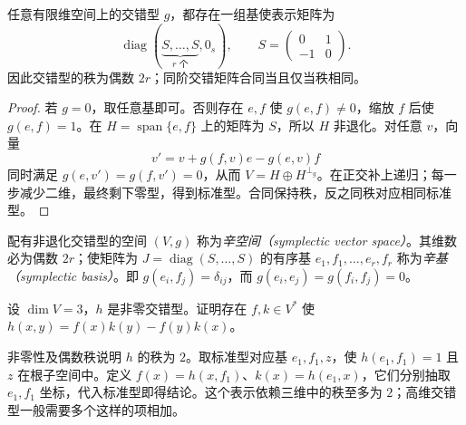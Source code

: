 \begin{theorem}
\label{thm:laex-alternating-normal}
任意有限维空间上的交错型 $g$，都存在一组基使表示矩阵为
\begin{equation}
 \operatorname{diag}(\underbrace{S,\ldots,S}_{r\text{ 个}},0_s),
 \qquad S=\begin{pmatrix}0&1\\-1&0\end{pmatrix}.
 \label{eq:laex-alternating-normal}
\end{equation}
因此交错型的秩为偶数 $2r$；同阶交错矩阵合同当且仅当秩相同。
\end{theorem}
\begin{proof}
若 $g=0$，取任意基即可。否则存在 $e,f$ 使 $g(e,f)\ne0$，缩放 $f$ 后使 $g(e,f)=1$。在 $H=\operatorname{span}\{e,f\}$ 上的矩阵为 $S$，所以 $H$ 非退化。对任意 $v$，向量
\begin{equation}
 v'=v+g(f,v)e-g(e,v)f
 \label{eq:laex-symplectic-elimination}
\end{equation}
同时满足 $g(e,v')=g(f,v')=0$，从而 $V=H\oplus H^{\perp_g}$。在正交补上递归；每一步减少二维，最终剩下零型，得到标准型。合同保持秩，反之同秩对应相同标准型。
\end{proof}

\begin{definition}
配有非退化交错型的空间 $(V,g)$ 称为\emph{辛空间（symplectic vector space）}。其维数必为偶数 $2r$；使矩阵为 $J=\operatorname{diag}(S,\ldots,S)$ 的有序基 $e_1,f_1,\ldots,e_r,f_r$ 称为\emph{辛基（symplectic basis）}。即 $g(e_i,f_j)=\delta_{ij}$，而 $g(e_i,e_j)=g(f_i,f_j)=0$。
\end{definition}

\begin{example}
\label{ex:laex-three-dimensional-alternating}
设 $\dim V=3$，$h$ 是非零交错型。证明存在 $f,k\in V^*$ 使 $h(x,y)=f(x)k(y)-f(y)k(x)$。
\end{example}
\begin{solve}
非零性及偶数秩说明 $h$ 的秩为 $2$。取标准型对应基 $e_1,f_1,z$，使 $h(e_1,f_1)=1$ 且 $z$ 在根子空间中。定义 $f(x)=h(x,f_1)$、$k(x)=h(e_1,x)$，它们分别抽取 $e_1,f_1$ 坐标，代入标准型即得结论。这个表示依赖三维中的秩至多为 $2$；高维交错型一般需要多个这样的项相加。
\end{solve}

